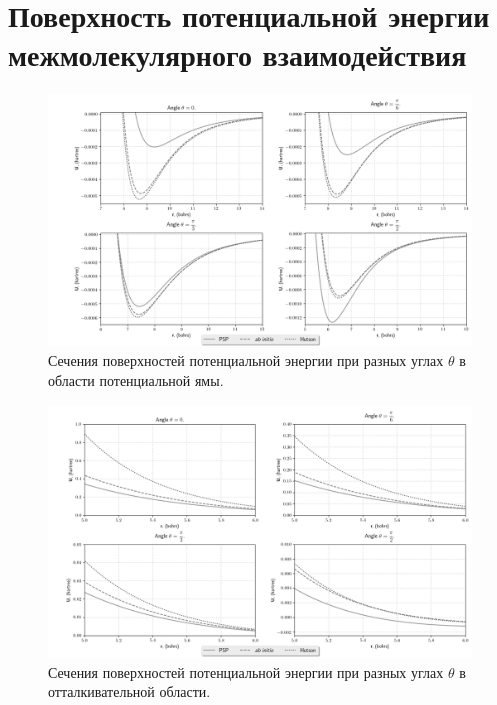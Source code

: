 \section{Поверхность потенциальной энергии межмолекулярного взаимодействия}
\vspace*{-1cm}
\begin{figure}[!ht]
	\hspace*{-1.2cm}
	\includegraphics[width=1.1\textwidth]{pictures/potential_well.png}
	\caption{Сечения поверхностей потенциальной энергии при разных углах $\theta$ в области потенциальной ямы.}
	\label{fig:pic1}
\end{figure}

\begin{figure}[!ht]
	\hspace*{-1.2cm}
	\includegraphics[width=1.1\textwidth]{pictures/potential_wall.png}
	\caption{Сечения поверхностей потенциальной энергии при разных углах $\theta$ в отталкивательной области.}
	\label{fig:pic2}
\end{figure}

